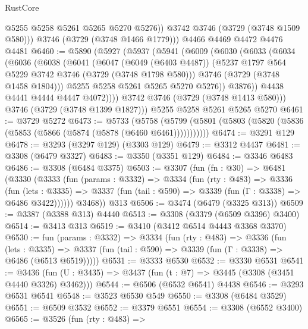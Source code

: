 \begin{lexlean}{RustCore}
\begin{coremodule}
            @5255
            @5258
            @5261
            @5265
            @5270
            @5276))
        @3742
        @3746
        (@3729 (@3748 @1509 @580)))
      @3746
      (@3729 (@3748 @1466 @1779)))
    @4466
    @4469
    @4472
    @4476
    @4481
@6460 := @5890
    (@5927
      (@5937
        (@5941
          (@6009
            (@6030
              (@6033
                (@6034
                  (@6036
                    (@6038
                      (@6041
                        (@6047
                          (@6049 (@6403 @4487))
                          (@5237 @1797 @564 @5229 @3742 @3746 (@3729 (@3748 @1798 @580)))
                          @3746
                          (@3729 (@3748 @1458 @1804)))
                        @5255
                        @5258
                        @5261
                        @5265
                        @5270
                        @5276))
                    @3876))
                @4438
                @4441
                @4444
                @4447
                @4072))))
        @3742
        @3746
        (@3729 (@3748 @1413 @580)))
      @3746
      (@3729 (@3748 @1399 @1827)))
    @5255
    @5258
    @5261
    @5265
    @5270
@6461 := @3729 @5272
@6473 := @5733
    (@5758 (@5799 (@5801 (@5803 (@5820 (@5836 (@5853 (@5866 (@5874 (@5878 (@6460 @6461)))))))))))
@6474 := @3291 @129
@6478 := @3293 (@3297 @129) (@3303 @129)
@6479 := @3312 @4437
@6481 := @3308 (@6479 @3327)
@6483 := @3350 (@3351 @129)
@6484 := @3346 @6483
@6486 := @3308 (@6484 @3375)
@6503 := @3307
    (fun (fn : @30) =>
    @6481
      (@3330
        (@3333
          (fun (params : @3332) =>
          @3334
            (fun (rty : @483) =>
            @3336
              (fun (lets : @3335) =>
              @3337 (fun (tail : @590) => @3339 (fun (Γ : @3338) => @6486 @3422))))))
        @3468))
    @313
@6506 := @3474 (@6479 (@3325 @313))
@6509 := @3387 (@3388 @313) @4440
@6513 := @3308 (@3379 (@6509 @3396) @3400)
@6514 := @3413 @313
@6519 := @3410 (@3412 @6514 @4443 @3368 @3370)
@6530 := fun (params : @3332) =>
  @3334
    (fun (rty : @483) =>
    @3336
      (fun (lets : @3335) =>
      @3337 (fun (tail : @590) => @3339 (fun (Γ : @3338) => @6486 (@6513 @6519)))))
@6531 := @3333 @6530
@6532 := @3330 @6531
@6541 := @3436 (fun (U : @3435) => @3437 (fun (t : @7) => @3445 (@3308 (@3451 @4440 @3326) @3462)))
@6544 := @6506 (@6532 @6541) @4438
@6546 := @3293 @6531 @6541
@6548 := @3523 @6530 @549
@6550 := @3308 (@6484 @3529)
@6551 := @6509 @3532
@6552 := @3379 @6551
@6554 := @3308 (@6552 @3400)
@6565 := @3526
    (fun (rty : @483) =>

\end{coremodule}
\end{lexlean}

